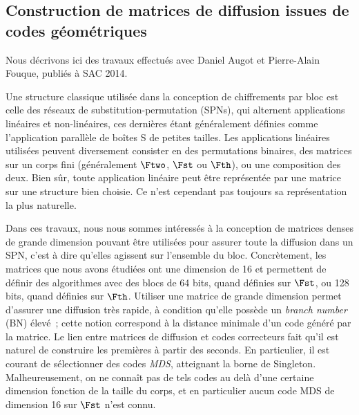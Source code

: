 \subsection[{Construction de matrices de diffusion issues de codes géométriques \cite{DBLP:conf/sacrypt/AugotFK14}}]{Construction de matrices de diffusion issues de codes géométriques~\cite{DBLP:conf/sacrypt/AugotFK14}}

Nous décrivons ici des travaux effectués avec Daniel Augot et Pierre-Alain Fouque, publiés à SAC 2014.

\medskip

Une structure classique utilisée dans la conception de chiffrements par bloc est celle des réseaux de substitution-permutation (SPNs),
qui alternent applications linéaires et non-linéaires, ces dernières étant
généralement définies comme l'application parallèle de boîtes S de petites tailles. Les applications linéaires utilisées peuvent diversement consister en des permutations binaires, des matrices sur
un corps fini (généralement $\Ftwo$, $\Fst$ ou $\Fth$), ou une composition des deux. Bien sûr, toute application linéaire peut être représentée par une matrice sur une structure bien choisie. Ce n'est
cependant pas toujours sa représentation la plus naturelle.

Dans ces travaux, nous nous sommes intéressés à la conception de matrices denses
de grande dimension pouvant être utilisées pour assurer toute la diffusion dans un SPN, c'est à dire qu'elles agissent sur l'ensemble du bloc. Concrètement, les matrices que nous
avons étudiées ont une dimension de 16
et permettent de définir des algorithmes avec des blocs de 64 bits, quand définies sur $\Fst$, ou 128 bits, quand définies sur $\Fth$.
Utiliser une matrice de grande dimension permet d'assurer une diffusion très rapide, à condition qu'elle possède un \emph{branch number} (BN) élevé~; cette notion correspond à la
distance minimale d'un code généré par la matrice.
Le lien entre matrices de diffusion et codes correcteurs fait qu'il est naturel de construire les premières à partir des seconds. En particulier, il est courant de sélectionner
des codes \emph{MDS}, atteignant la borne de Singleton. Malheureusement, on ne connaît pas de tels codes au delà d'une certaine dimension fonction de la taille du corps, et en particulier
aucun code MDS de dimension 16 sur $\Fst$ n'est connu.

